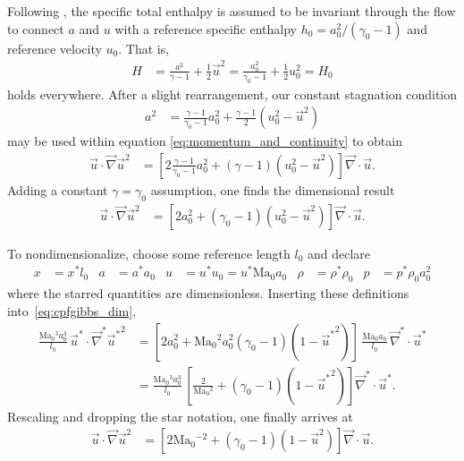 \documentclass[letterpaper,11pt,nointlimits,reqno]{amsart}
\newcommand{\Mach}[1][]{\mbox{Ma}_{#1}}
\begin{document}
Following \citeauthor{Saad2011Coordinate}, the specific total enthalpy is
assumed to be invariant through the flow to connect $a$ and $u$ with a
reference specific enthalpy $h_0 = a_0^2 / \left(\gamma_0-1\right)$ and
reference velocity $u_0$.  That is,
\begin{align}
     H
     &=
        \frac{a^2  }{\gamma  -1} + \frac{1}{2} \vec{u}^2
      = \frac{a_0^2}{\gamma_0-1} + \frac{1}{2} u_0^2
      =  H_0
\end{align}
holds everywhere.  After a slight rearrangement, our constant stagnation
condition
\begin{align}
        a^2
     &=   \frac{\gamma-1}{\gamma_0-1} a_0^2
        + \frac{\gamma-1}{2} \left(u_0^2 - \vec{u}^2\right)
\label{eq:stagnation_sound}
\end{align}
may be used within equation \eqref{eq:momentum_and_continuity} to obtain
\begin{align}
       \vec{u}\cdot \vec{\nabla}\vec{u}^2
    &= \left[
          2 \frac{\gamma-1}{\gamma_0-1} a_0^2
        + \left(\gamma-1\right) \left(u_0^2 - \vec{u}^2\right)
       \right]\vec{\nabla}\cdot\vec{u}
.
\end{align}
Adding a constant $\gamma=\gamma_0$ assumption, one finds the dimensional result
\begin{align}
       \vec{u}\cdot \vec{\nabla}\vec{u}^2
    &= \left[
          2 a_0^2
        + \left(\gamma_0-1\right) \left(u_0^2 - \vec{u}^2\right)
       \right]\vec{\nabla}\cdot\vec{u}
\label{eq:cpfgibbs_dim}
.
\end{align}

To nondimensionalize, choose some reference length $l_0$ and declare
\begin{align}
    x     &= x^\ast l_0
&   a     &= a^\ast a_0
&   u     &= u^\ast u_0 = u^\ast \Mach[0] a_0
&   \rho  &= \rho^\ast \rho_0
&   p     &= p^\ast \rho_0 a_0^2
\label{eq:nondimensionalization}
\end{align}
where the starred quantities are dimensionless.  Inserting these definitions
into~\eqref{eq:cpfgibbs_dim},
\begin{align}
       \frac{\Mach[0]{}^3 a_0^3}{l_0}
       \,
       \vec{u}^\ast \cdot \vec{\nabla}^\ast{\vec{u}^\ast}^2
    &=
       \left[
          2 a_0^2
        + \Mach[0]{}^2 a_0^2 \left(\gamma_0-1\right) \left(1 - {\vec{u}^\ast}^2\right)
       \right]
       \,
       \frac{\Mach[0]{} a_0}{l_0}
       \,
       \vec{\nabla}^\ast\cdot\vec{u}^\ast
\\
    &=
       \frac{\Mach[0]{}^3 a_0^3}{l_0}
       \,
       \left[
          \frac{2}{\Mach[0]{}^2}
        + \left(\gamma_0-1\right) \left(1 - {\vec{u}^\ast}^2\right)
       \right]
       \vec{\nabla}^\ast\cdot\vec{u}^\ast
.
\end{align}
Rescaling and dropping the star notation, one finally arrives at
\begin{align}
       \vec{u} \cdot \vec{\nabla}\vec{u}^2
    &=
       \left[
          2 \Mach[0]{}^{-2}
        + \left(\gamma_0-1\right) \left(1 - \vec{u}^2\right)
       \right]
       \vec{\nabla}\cdot\vec{u}
\label{eq:cpfgibbs_nondim}
.
\end{align}
\end{document}
